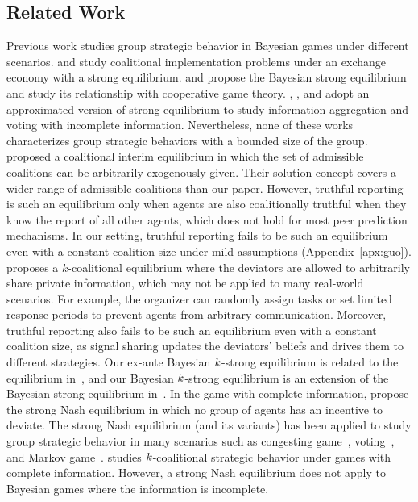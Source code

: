 \subsection{Related Work}
Previous work studies group strategic behavior in Bayesian games under different scenarios. \citet{hahn2001coalitional} and \citet{safronov2018coalition} study coalitional implementation problems under an exchange economy with a strong equilibrium. \citet{ichiishi1996bayesian} and \citet{ichiishicooperative} propose the Bayesian strong equilibrium and study its relationship with cooperative game theory.  \citet{schoenebeck21wisdom}, \citet{han2023wisdom}, and \citet{deng2024aggregation} adopt an approximated version of strong equilibrium to study information aggregation and voting with incomplete information. Nevertheless, none of these works characterizes group strategic behaviors with a bounded size of the group. 
\citet{guo2022robust} proposed a coalitional interim equilibrium in which the set of admissible coalitions can be arbitrarily exogenously given. Their solution concept covers a wider range of admissible coalitions than our paper. However, truthful reporting is such an equilibrium only when agents are also coalitionally truthful when they know the report of all other agents, which does not hold for most peer prediction mechanisms. In our setting, truthful reporting fails to be such an equilibrium even with a constant coalition size under mild assumptions (Appendix~\ref{apx:guo}).
\citet{Abraham2008:lower} proposes a $k$-coalitional equilibrium where the deviators are allowed to arbitrarily share private information, which may not be applied to many real-world scenarios. For example, the organizer can randomly assign tasks or set limited response periods to prevent agents from arbitrary communication. Moreover, truthful reporting also fails to be such an equilibrium even with a constant coalition size, as signal sharing updates the deviators' beliefs and drives them to different strategies. 
Our ex-ante Bayesian $k$-strong equilibrium is related to the equilibrium in~\citep{schoenebeck21wisdom, han2023wisdom,deng2024aggregation}, and our Bayesian $k$-strong equilibrium is an extension of the Bayesian strong equilibrium in~\citep{ichiishi1996bayesian}. In the game with complete information, \citet{Aumann59:Acceptable} propose the strong Nash equilibrium in which no group of agents has an incentive to deviate. The strong Nash equilibrium (and its variants) has been applied to study group strategic behavior in many scenarios such as congesting game~\citep{holzman1997strong,yin2011nash,harks2012existence}, voting~\citep{desmedt2010equilibria, barbera2001voting,rabinovich2015analysis}, and Markov game~\citep{clempner2015computing,clempner2020finding}. \citet{Abraham2006:distributed} studies $k$-coalitional strategic behavior under games with complete information. However, a strong Nash equilibrium does not apply to Bayesian games where the information is incomplete. 


